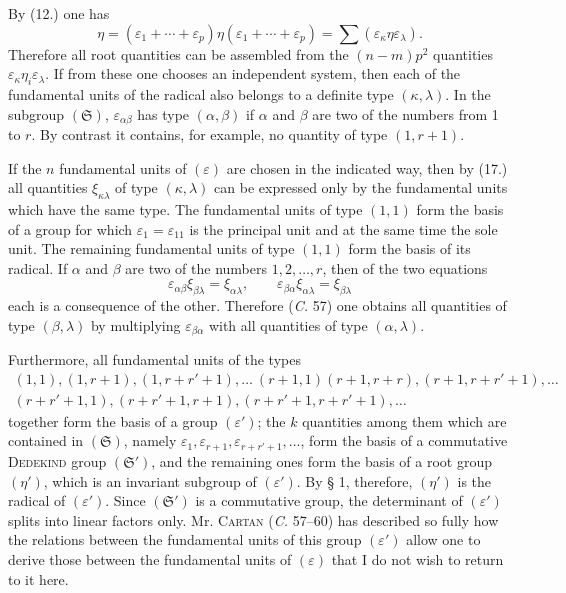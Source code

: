 \documentclass[11pt]{article}
\newcommand{\eps}{\varepsilon}
\newcommand{\grS}{\mathfrak{S}}
\begin{document}
By (12.) one has
\[
 \eta=(\eps_1+\cdots+\eps_p)\eta(\eps_1+\cdots+\eps_p)=\sum(\eps_\kappa\eta\eps_\lambda).
\]
Therefore all root quantities can be assembled from the $(n-m)p^2$ quantities $\eps_\kappa\eta_i\eps_\lambda$. If from these one chooses an independent system, then each of the fundamental units of the radical also belongs to a definite type $(\kappa,\lambda)$. In the subgroup $(\grS)$, $\eps_{\alpha\beta}$ has type $(\alpha,\beta)$ if $\alpha$ and $\beta$ are two of the numbers from 1 to $r$. By contrast it contains, for example, no quantity of type $(1,r+1)$.

If the $n$ fundamental units of $(\eps)$ are chosen in the indicated way, then by (17.) all quantities $\xi_{\kappa\lambda}$ of type $(\kappa,\lambda)$ can be expressed only by the fundamental units which have the same type. The fundamental units of type $(1,1)$ form the basis of a group for which $\eps_1=\eps_{11}$ is the principal unit and at the same time the sole unit. The remaining fundamental units of type $(1,1)$ form the basis of its radical. If $\alpha$ and $\beta$ are two of the numbers $1,2,\ldots,r$, then of the two equations
\[
 \eps_{\alpha\beta}\xi_{\beta\lambda}=\xi_{\alpha\lambda},
 \qquad
 \eps_{\beta\alpha}\xi_{\alpha\lambda}=\xi_{\beta\lambda}
\]
each is a consequence of the other. Therefore (\emph{C.} 57) one obtains all quantities of type $(\beta,\lambda)$ by multiplying $\eps_{\beta\alpha}$ with all quantities of type $(\alpha,\lambda)$.

Furthermore, all fundamental units of the types
\[
\begin{gathered}
 (1,1),(1,r+1),(1,r+r'+1),\ldots\ (r+1,1)(r+1,r+r),(r+1,r+r'+1),\ldots \\
 (r+r'+1,1),(r+r'+1,r+1),(r+r'+1,r+r'+1),\ldots
\end{gathered}
\]
together form the basis of a group $(\eps')$; the $k$ quantities among them which are contained in $(\grS)$, namely $\eps_1,\eps_{r+1},\eps_{r+r'+1},\ldots$, form the basis of a commutative \textsc{Dedekind} group $(\grS')$, and the remaining ones form the basis of a root group $(\eta')$, which is an invariant subgroup of $(\eps')$. By § 1, therefore, $(\eta')$ is the radical of $(\eps')$. Since $(\grS')$ is a commutative group, the determinant of $(\eps')$ splits into linear factors only. Mr. \textsc{Cartan} (\emph{C.} 57--60) has described so fully how the relations between the fundamental units of this group $(\eps')$ allow one to derive those between the fundamental units of $(\eps)$ that I do not wish to return to it here.
\end{document}
